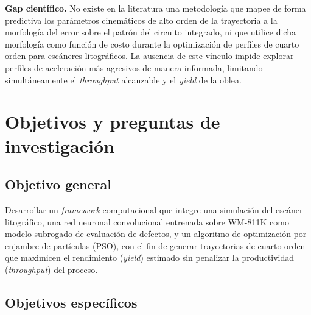 \documentclass[11pt]{article}
\begin{document}
\begin{framed}
\textbf{Gap científico.} No existe en la literatura una metodología que mapee de forma predictiva los parámetros cinemáticos de alto orden de la trayectoria a la morfología del error sobre el patrón del circuito integrado, ni que utilice dicha morfología como función de costo durante la optimización de perfiles de cuarto orden para escáneres litográficos. La ausencia de este vínculo impide explorar perfiles de aceleración más agresivos de manera informada, limitando simultáneamente el \textit{throughput} alcanzable y el \textit{yield} de la oblea.
\end{framed}

\section{Objetivos y preguntas de investigación}

\subsection*{Objetivo general}

Desarrollar un \textit{framework} computacional que integre una simulación del escáner litográfico, una red neuronal convolucional entrenada sobre WM-811K como modelo subrogado de evaluación de defectos, y un algoritmo de optimización por enjambre de partículas (PSO), con el fin de generar trayectorias de cuarto orden que maximicen el rendimiento (\textit{yield}) estimado sin penalizar la productividad (\textit{throughput}) del proceso.

\subsection*{Objetivos específicos}
\end{document}
